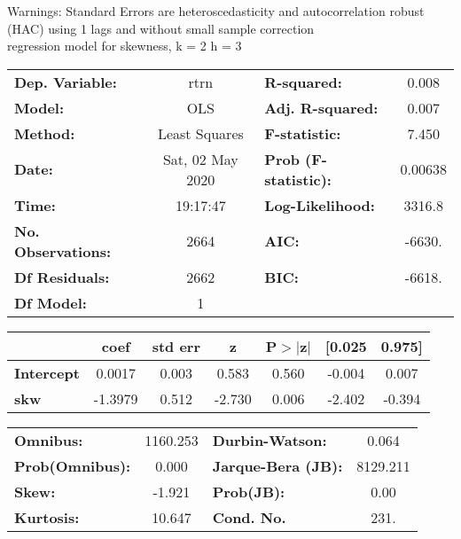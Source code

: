 Warnings: \newline
 [1] Standard Errors are heteroscedasticity and autocorrelation robust (HAC) using 1 lags and without small sample correction\\ 

regression model for skewness, k = 2 h = 3\begin{center}
\begin{tabular}{lclc}
\toprule
\textbf{Dep. Variable:}    &       rtrn       & \textbf{  R-squared:         } &     0.008   \\
\textbf{Model:}            &       OLS        & \textbf{  Adj. R-squared:    } &     0.007   \\
\textbf{Method:}           &  Least Squares   & \textbf{  F-statistic:       } &     7.450   \\
\textbf{Date:}             & Sat, 02 May 2020 & \textbf{  Prob (F-statistic):} &  0.00638    \\
\textbf{Time:}             &     19:17:47     & \textbf{  Log-Likelihood:    } &    3316.8   \\
\textbf{No. Observations:} &        2664      & \textbf{  AIC:               } &    -6630.   \\
\textbf{Df Residuals:}     &        2662      & \textbf{  BIC:               } &    -6618.   \\
\textbf{Df Model:}         &           1      & \textbf{                     } &             \\
\bottomrule
\end{tabular}
\begin{tabular}{lcccccc}
                   & \textbf{coef} & \textbf{std err} & \textbf{z} & \textbf{P$> |$z$|$} & \textbf{[0.025} & \textbf{0.975]}  \\
\midrule
\textbf{Intercept} &       0.0017  &        0.003     &     0.583  &         0.560        &       -0.004    &        0.007     \\
\textbf{skw}       &      -1.3979  &        0.512     &    -2.730  &         0.006        &       -2.402    &       -0.394     \\
\bottomrule
\end{tabular}
\begin{tabular}{lclc}
\textbf{Omnibus:}       & 1160.253 & \textbf{  Durbin-Watson:     } &    0.064  \\
\textbf{Prob(Omnibus):} &   0.000  & \textbf{  Jarque-Bera (JB):  } & 8129.211  \\
\textbf{Skew:}          &  -1.921  & \textbf{  Prob(JB):          } &     0.00  \\
\textbf{Kurtosis:}      &  10.647  & \textbf{  Cond. No.          } &     231.  \\
\bottomrule
\end{tabular}
\end{center}

